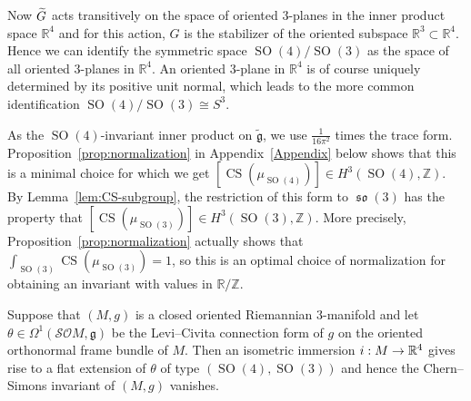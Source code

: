 \documentclass[AHL,Unicode,longabstracts]{cedram}
\newcommand{\Om}{\Omega}
\DeclareMathOperator{\CS}{CS}
\DeclareMathOperator{\SO}{SO}
\DeclareMathOperator{\fkso}{\mathfrak{so}}
\newcommand*{\R}{\mathbb{R}}
\newcommand{\Z}{\mathbb{Z}}
\newcommand{\tfg}{\widetilde{\mathfrak g}}
\newcommand{\fkg}{\mathfrak{g}}
\newcommand{\clSO}{\mathcal{SO}}
\renewcommand*{\to}{\mathchoice{\longrightarrow}{\rightarrow}{\rightarrow}{\rightarrow}}
\let\oldtilde\tilde
\renewcommand*{\tilde}[1]{\mathchoice{\widetilde{#1}}{\widetilde{#1}}{\oldtilde{#1}}{\oldtilde{#1}}}
\newcommand*{\R}{\mathbb{R}}
\begin{document}
Now $\tilde G$ acts transitively on the space of oriented $3$-planes in the inner product space $\R^4$ and for this action, $G$ is the stabilizer of the oriented subspace $\R^3\subset\R^4$. Hence we can identify the symmetric space $\SO(4)/\SO(3)$ as the space of all oriented $3$-planes in $\R^4$. An oriented $3$-plane in $\R^4$ is of course uniquely determined by its positive unit normal, which leads to the more common identification $\SO(4)/\SO(3)\cong S^3$.

As the $\SO(4)$-invariant inner product on $\tfg$, we use $\frac{1}{16\pi^2}$ times the trace form. Proposition~\ref{prop:normalization} in Appendix~\ref{Appendix} below shows that this is a minimal choice for which we get $[\CS(\mu_{\SO(4)})]\in H^3(\SO(4),\Z)$. By Lemma~\ref{lem:CS-subgroup}, the restriction of this form to $\fkso(3)$ has the property that $[\CS(\mu_{\SO(3)})]\in H^3(\SO(3),\Z)$. More precisely, Proposition~\ref{prop:normalization} actually shows that $\int_{\SO(3)}\CS(\mu_{\SO(3)})=1$, so this is an optimal choice of normalization for obtaining an invariant with values in $\R/\Z$.

\begin{prop}\label{prop:Riemannflatext}
Suppose that $(M,g)$ is a closed oriented Riemannian $3$-manifold and let $\theta\in\Om^1(\clSO M,\fkg)$ be the Levi--Civita connection form of $g$ on the oriented orthonormal frame bundle of $M$. Then an isometric immersion $i: M\to
\R^4$ gives rise to a flat extension of $\theta$ of type $(\SO(4),\SO(3))$ and hence the Chern--Simons invariant of $(M,g)$ vanishes.
\end{prop}
\end{document}

